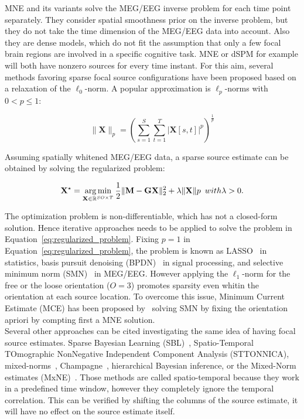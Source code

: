 MNE and its variants solve the MEG/EEG inverse problem for each time point separately. They consider spatial smoothness prior on the inverse problem, but they do not take the time dimension of the MEG/EEG data into account. Also they are dense models, which do not fit the assumption that only a few focal brain regions are involved in a specific cognitive task. MNE or dSPM for example will both have nonzero sources for every time instant.
For this aim, several methods favoring sparse focal source configurations have been proposed based on a relaxation of the $\ell_0$-norm. A popular approximation is $\ell_p$-norms with $0<p\leq 1$:

\begin{equation} 
\|\mathbf{X}\|_p = (\sum_{s=1}^S\sum_{t=1}^T|\mathbf{X}[s,t]|^p)^{\frac{1}{p}}
\end{equation} \label{eq:lp_norms}

Assuming spatially whitened MEG/EEG data, a sparse source estimate can be obtained by solving the regularized problem:

\begin{equation}
\mathbf{X}^\star = \mathop{\mathrm{arg}\,\mathrm{min}}_{\mathbf{X}\in\mathbb{R}^{SO\times T}} \frac{1}{2}\|\mathbf{M}-\mathbf{GX}\|_2^2 + \lambda\|\mathbf{X}\|p \hspace{5pt} with \lambda > 0.
\end{equation} \label{eq:regularized_problem}

The optimization problem is non-differentiable, which has not a closed-form solution. Hence iterative approaches needs to be applied to solve the problem in Equation~\eqref{eq:regularized_problem}. Fixing $p=1$ in Equation~\eqref{eq:regularized_problem}, the problem is known as LASSO~\cite{Tibshirani96} in statistics, basis pursuit denoising (BPDN)~\cite{Chen_Donoho_Saunders98} in signal processing, and selective minimum norm (SMN)~\cite{matsuura1995selective} in MEG/EEG. However applying the $\ell_1$-norm for the free or the loose orientation ($O=3$) promotes sparsity even whitin the orientation at each source location. To overcome this issue, Minimum Current Estimate (MCE) has been proposed by~\cite{Uutela-etal:1999} solving SMN by fixing the orientation apriori by compting first a MNE solution. \\

Several other approaches can be cited investigating the same idea of having focal source estimates. Sparse Bayesian Learning (SBL)~\cite{wipf2006bayesian}, Spatio-Temporal TOmographic NonNegative Independent Component Analysis (STTONNICA)\cite{valdes2009eeg}, mixed-norms~\cite{ou2009distributed}, Champagne~\cite{owen2012performance}, hierarchical Bayesian inference\cite{lucka2012hierarchical}, or the Mixed-Norm estimates (MxNE)~\cite{gramfort2012mixed}. Those methods are called spatio-temporal because they work in a predefined time window, however they completely ignore the temporal correlation. This can be verified by shifting the columns of the source estimate, it will have no effect on the source estimate itself. \\

